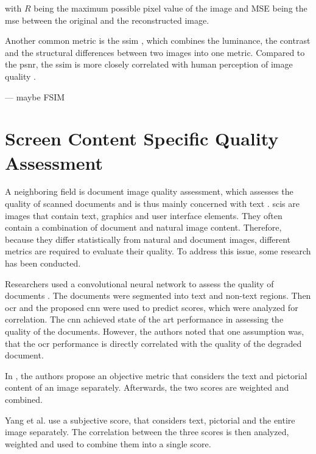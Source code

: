 with \(R\) being the maximum possible pixel value of the image and MSE being the \gls{mse} between the original and the reconstructed image.

Another common metric is the \gls{ssim} \cite{SSIM_2004}, which combines the luminance, the contrast and the structural differences between two images into one metric.
Compared to the \gls{psnr}, the \gls{ssim} is more closely correlated with human perception of image quality \cite{frmetric_comp_2012}.

--- maybe FSIM


\section{Screen Content Specific Quality Assessment}

A neighboring field is document image quality assessment, which assesses the quality of scanned documents and is thus mainly concerned with text \cite{3_subj_weight_2015}.
\Glspl{sci} are images that contain text, graphics and user interface elements.
They often contain a combination of document and natural image content.
Therefore, because they differ statistically from natural and document images, different metrics are required to evaluate their quality.
To address this issue, some research has been conducted.

Researchers used a convolutional neural network to assess the quality of documents \cite{ocr_cnn_docu_2014}.
The documents were segmented into text and non-text regions.
Then \gls{ocr} and the proposed \gls{cnn} were used to predict scores, which were analyzed for correlation.
The \gls{cnn} achieved state of the art performance in assessing the quality of the documents.
However, the authors noted that one assumption was, that the \gls{ocr} performance is directly correlated with the quality of the degraded document.

In \cite{text_pict_weight_2017}, the authors propose an objective metric that considers the text and pictorial content of an image separately.
Afterwards, the two scores are weighted and combined.

Yang et al. \cite{3_subj_weight_2015} use a subjective score, that considers text, pictorial and the entire image separately.
The correlation between the three scores is then analyzed, weighted and used to combine them into a single score.

